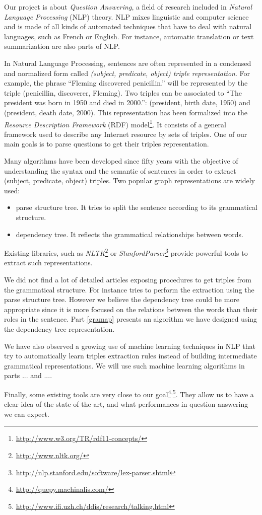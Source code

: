 Our project is about \textit{Question Answering}, a field of research included in \textit{Natural Language Processing} (NLP) theory. NLP mixes linguistic and computer science and is made of all kinds of automated techniques that have to deal with natural languages, such as French or English. For instance, automatic translation or text summarization are also parts of NLP.

In Natural Language Processing, sentences are often represented in a condensed and normalized form called \textit{(subject, predicate, object) triple representation}. For example, the phrase ``Fleming discovered penicillin.'' will be represented by the triple (penicillin, discoverer, Fleming). Two triples can be associated to ``The president was born in 1950 and died in 2000.'': (president, birth date, 1950) and (president, death date, 2000). This representation has been formalized into the \textit{Resource Description Framework} (RDF) model\footnote{\url{http://www.w3.org/TR/rdf11-concepts/}}. It consists of a general framework used to describe any Internet resource by sets of triples. One of our main goals is to parse questions to get their triples representation.

Many algorithms have been developed since fifty years with the objective of understanding the syntax and the semantic of sentences in order to extract (subject, predicate, object) triples. Two popular graph representations are widely used:
\begin{itemize}
 \item parse structure tree. It tries to split the sentence according to its grammatical structure.
 \item dependency tree. It reflects the grammatical relationships between words.
\end{itemize}
Existing libraries, such as \textit{NLTK}\footnote{\url{http://www.nltk.org/}} or \textit{StanfordParser}\footnote{\url{http://nlp.stanford.edu/software/lex-parser.shtml}} provide powerful tools to extract such representations.

We did not find a lot of detailed articles exposing procedures to get triples from the grammatical structure. For instance \cite{parsetree} tries to perform the extraction using the parse structure tree. However we believe the dependency tree could be more appropriate since it is more focused on the relations between the words than their roles in the sentence. Part \ref{gramap} presents an algorithm we have designed using the dependency tree representation.

We have also observed a growing use of machine learning techniques in NLP that try to automatically learn triples extraction rules instead of building intermediate grammatical representations. We will use such machine learning algorithms in parts ... and ....

Finally, some existing tools are very close to our goal\footnote{\url{http://quepy.machinalis.com/}}\textsuperscript{,}\footnote{\url{http://www.ifi.uzh.ch/ddis/research/talking.html}}. They allow us to have a clear idea of the state of the art, and what performances in question answering we can expect.
